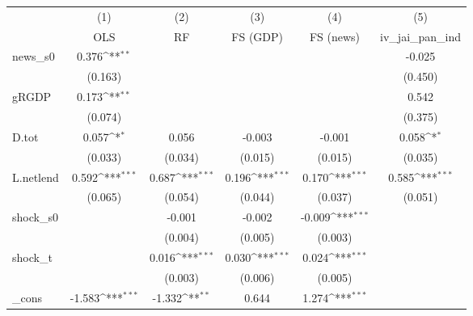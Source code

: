 {
\def\sym#1{\ifmmode^{#1}\else\(^{#1}\)\fi}
\begin{tabular}{l*{5}{c}}
\toprule
            &\multicolumn{1}{c}{(1)}&\multicolumn{1}{c}{(2)}&\multicolumn{1}{c}{(3)}&\multicolumn{1}{c}{(4)}&\multicolumn{1}{c}{(5)}\\
            &\multicolumn{1}{c}{OLS}&\multicolumn{1}{c}{RF}&\multicolumn{1}{c}{FS (GDP)}&\multicolumn{1}{c}{FS (news)}&\multicolumn{1}{c}{iv\_jai\_pan\_ind}\\
\midrule
news\_s0     &       0.376\sym{**} &                     &                     &                     &      -0.025         \\
            &     (0.163)         &                     &                     &                     &     (0.450)         \\
\addlinespace
gRGDP       &       0.173\sym{**} &                     &                     &                     &       0.542         \\
            &     (0.074)         &                     &                     &                     &     (0.375)         \\
\addlinespace
D.tot       &       0.057\sym{*}  &       0.056         &      -0.003         &      -0.001         &       0.058\sym{*}  \\
            &     (0.033)         &     (0.034)         &     (0.015)         &     (0.015)         &     (0.035)         \\
\addlinespace
L.netlend   &       0.592\sym{***}&       0.687\sym{***}&       0.196\sym{***}&       0.170\sym{***}&       0.585\sym{***}\\
            &     (0.065)         &     (0.054)         &     (0.044)         &     (0.037)         &     (0.051)         \\
\addlinespace
shock\_s0    &                     &      -0.001         &      -0.002         &      -0.009\sym{***}&                     \\
            &                     &     (0.004)         &     (0.005)         &     (0.003)         &                     \\
\addlinespace
shock\_t     &                     &       0.016\sym{***}&       0.030\sym{***}&       0.024\sym{***}&                     \\
            &                     &     (0.003)         &     (0.006)         &     (0.005)         &                     \\
\addlinespace
\_cons      &      -1.583\sym{***}&      -1.332\sym{**} &       0.644         &       1.274\sym{***}&                     \\

\end{tabular}}
